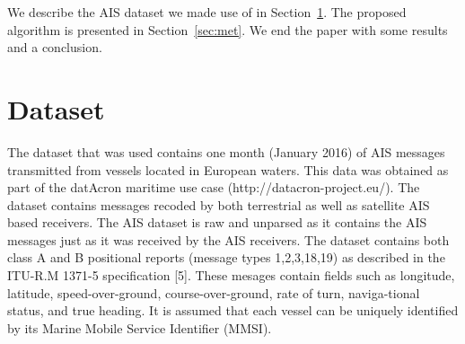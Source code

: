 \documentclass{article}
\begin{document}
 We describe the AIS dataset we made use of in Section~\ref{sec:data}. The proposed algorithm is presented in Section~\ref{sec:met}. We end the paper with some results and a conclusion.

% 
% 
% 
% 
 
\section{Dataset}
\label{sec:data}
The dataset that was used contains one month (January 2016) of AIS messages transmitted from vessels located in European waters. This data was
obtained as part of the datAcron maritime use case (http://datacron-project.eu/).  
The dataset contains messages recoded by both terrestrial as well as satellite AIS based receivers. The AIS dataset is raw and unparsed as it contains the AIS messages 
just as it was received by the AIS receivers. The dataset contains both class A and B positional reports (message types 1,2,3,18,19)
as described in the ITU-R.M 1371-5 specification [5]. These mesages contain fields such as longitude, latitude,
speed-over-ground, course-over-ground, rate of turn, naviga-tional status, and true heading. It is assumed that each vessel
can be uniquely identified by its Marine Mobile Service Identifier (MMSI). 
\end{document}
